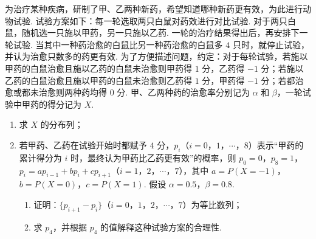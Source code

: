 \begin{problem}
为治疗某种疾病，研制了甲、乙两种新药，希望知道哪种新药更有效，为此进行动物试验. 试验方案如下：每一轮选取两只白鼠对药效进行对比试验. 对于两只白鼠，随机选一只施以甲药，另一只施以乙药. 一轮的治疗结果得出后，再安排下一轮试验. 当其中一种药治愈的白鼠比另一种药治愈的白鼠多 \(4\) 只时，就停止试验，并认为治愈只数多的药更有效. 为了方便描述问题，约定：对于每轮试验，若施以甲药的白鼠治愈且施以乙药的白鼠未治愈则甲药得 \(1\) 分，乙药得 \(-1\) 分；若施以乙药的白鼠治愈且施以甲药的白鼠未治愈则乙药得 \(1\) 分，甲药得 \(-1\) 分；若都治愈或都未治愈则两种药均得 \(0\) 分. 甲、乙两种药的治愈率分别记为 \(\alpha\) 和 \(\beta\)，一轮试验中甲药的得分记为 \(X\).

\begin{enumerate}
\item 求 \(X\) 的分布列；

\item 若甲药、乙药在试验开始时都赋予 \(4\) 分，\(p_i\)（\(i=0\)，\(1\)，\(\cdots\)，\(8\)）表示“甲药的累计得分为 \(i\) 时，最终认为甲药比乙药更有效”的概率，则 \(p_0=0\)，\(p_8=1\)，\(p_i=ap_{i-1}+bp_i+cp_{i+1}\)（\(i=1\)，\(2\)，\(\cdots\)，\(7\)），其中 \(a=P(X=-1)\)，\(b=P(X=0)\)，\(c=P(X=1)\). 假设 \(\alpha=0.5\)，\(\beta=0.8\).

\begin{enumerate}
\item 证明：\(\{p_{i+1}-p_i\}\)（\(i=0\)，\(1\)，\(2\)，\(\cdots\)，\(7\)）为等比数列；
\item 求 \(p_4\)，并根据 \(p_4\) 的值解释这种试验方案的合理性.
\end{enumerate}
\end{enumerate}
\end{problem}

